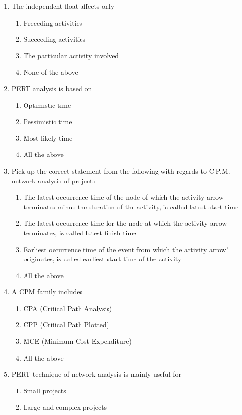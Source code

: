 \documentclass[11pt,a4paper]{article}
\begin{document}
\begin{enumerate}
\begin{enumerate*}[itemjoin=\qquad, label=\Alph*.]
\end{enumerate*}
\item{The independent float affects only}
\begin{enumerate}[label=\Alph*.]
\item{Preceding activities}
\item{Succeeding activities}
\item{The particular activity involved}
\item{None of the above}
\end{enumerate}
\item{PERT analysis is based on}
\begin{enumerate}[label=\Alph*.]
\item{Optimistic time}
\item{Pessimistic time}
\item{Most likely time}
\item{All the above}
\end{enumerate}
\item{Pick up the correct statement from the following with regards to C.P.M. network analysis of projects}
\begin{enumerate}[label=\Alph*.]
\item{The latest occurrence time of the node of which the activity arrow terminates minus the duration of the activity, is called latest start time}
\item{The latest occurrence time for the node at which the activity arrow terminates, is called latest finish time}
\item{Earliest occurrence time of the event from which the activity arrow' originates, is called earliest start time of the activity}
\item{All the above}
\end{enumerate}
\item{A CPM family includes}
\begin{enumerate}[label=\Alph*.]
\item{CPA (Critical Path Analysis)}
\item{CPP (Critical Path Plotted)}
\item{MCE (Minimum Cost Expenditure)}
\item{All the above}
\end{enumerate}
\item{PERT technique of network analysis is mainly useful for}
\begin{enumerate}[label=\Alph*.]
\item{Small projects}
\item{Large and complex projects}

\end{enumerate}
\end{enumerate}
\end{document}
